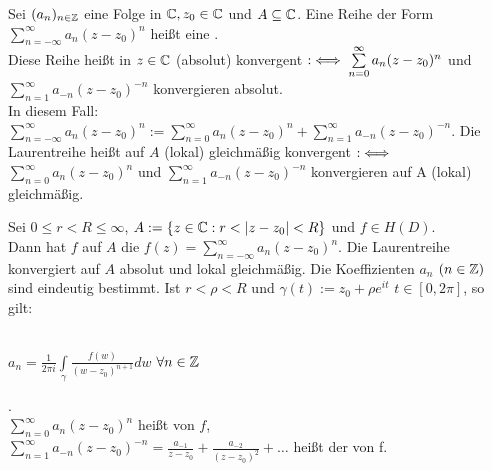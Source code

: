 \documentclass[a4paper,twoside,DIV15,BCOR12mm]{scrbook}
\def\gdw{\equizu}
\def\gdw{\equizu}
\begin{document}
\begin{definition}
Sei $(a_n)_{n \in \mathbb{Z}}$ eine Folge in $\mathbb{C}, z_0 \in \mathbb{C}$ und $A \subseteq
\mathbb{C}$. Eine Reihe der Form $\sum\limits_{n=-\infty}^{\infty} a_n(z-z_0)^n$ heißt eine
. \\
Diese Reihe heißt in $z \in \mathbb{C}$ (absolut) konvergent $: \gdw
\sum\limits_{n=0}^{\infty} a_n(z-z_0)^n$  und $\sum\limits_{n=1}^{\infty}
a_{-n}(z-z_0)^{-n}$ konvergieren absolut. \\ In diesem Fall: $\sum\limits_{n=-\infty}^{\infty}
a_n(z-z_0)^n := \sum\limits_{n=0}^{\infty} a_n(z-z_0)^n + \sum\limits_{n=1}^{\infty}
a_{-n}(z-z_0)^{-n}$. Die Laurentreihe heißt auf $A$ (lokal) gleichmäßig
konvergent $:\gdw$ $\sum\limits_{n=0}^{\infty} a_n(z-z_0)^n$ und $\sum\limits_{n=1}^{\infty}
a_{-n}(z-z_0)^{-n}$ konvergieren auf A (lokal) gleichmäßig.
\end{definition}
\begin{satz}
Sei $0 \leq r < R \leq \infty$, $A := \{z \in \mathbb{C}: r < |z-z_0| < R\}$ und $f
\in H(D).$ \\Dann hat $f$ auf $A$ die  
$f(z) = \sum\limits_{n=-\infty}^{\infty} a_n(z-z_0)^n$. Die Laurentreihe
konvergiert auf $A$ absolut und lokal gleichmäßig. Die Koeffizienten $a_n$ $(n
\in \mathbb{Z} )$ sind eindeutig bestimmt. Ist $r < \rho < R$ und $\gamma(t) := z_0 +
\rho e^{it}$ $t \in [0,2\pi]$, so gilt: \\ \\
\centerline{$a_n = \frac{1}{2\pi i} \int\limits_{\gamma} 
\frac{f(w)}{(w-z_0)^{n+1}} dw$ $\forall n \in \mathbb{Z}$}. \\
$\sum\limits_{n=0}^{\infty} a_n(z-z_0)^n$ heißt  von $f$, \\
$\sum\limits_{n=1}^{\infty} a_{-n}(z-z_0)^{-n} = \frac{a_{-1}}{z-z_0}+
\frac{a_{-2}}{(z-z_0)^2} + \ldots$ heißt der  von f.
\end{satz}
\end{document}
